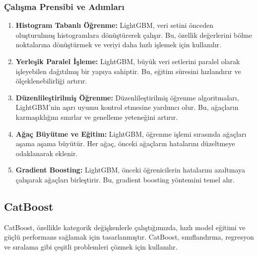 \subsubsection{Çalışma Prensibi ve Adımları}
\begin{enumerate}
\item \textbf{Histogram Tabanlı Öğrenme:} LightGBM, veri setini önceden oluşturulmuş histogramlara dönüştürerek çalışır. Bu, özellik değerlerini bölme noktalarına dönüştürmek ve veriyi daha hızlı işlemek için kullanılır.
\item \textbf{Yerleşik Paralel İşleme:} LightGBM, büyük veri setlerini paralel olarak işleyebilen dağıtılmış bir yapıya sahiptir. Bu, eğitim süresini hızlandırır ve ölçeklenebilirliği artırır.
\item \textbf{Düzenlileştirilmiş Öğrenme:} Düzenlileştirilmiş öğrenme algoritmaları, LightGBM'nin aşırı uyumu kontrol etmesine yardımcı olur. Bu, ağaçların karmaşıklığını sınırlar ve genelleme yeteneğini artırır.
\item \textbf{Ağaç Büyütme ve Eğitim:} LightGBM, öğrenme işlemi sırasında ağaçları aşama aşama büyütür. Her ağaç, önceki ağaçların hatalarını düzeltmeye odaklanarak eklenir.
\item \textbf{Gradient Boosting:} LightGBM, önceki öğrenicilerin hatalarını azaltmaya çalışarak ağaçları birleştirir. Bu, gradient boosting yöntemini temel alır.
\end{enumerate}

\subsection{CatBoost}
CatBoost, özellikle kategorik değişkenlerle çalıştığımızda, hızlı model eğitimi ve güçlü performans sağlamak için tasarlanmıştır. CatBoost, sınıflandırma, regresyon ve sıralama gibi çeşitli problemleri çözmek için kullanılır.

